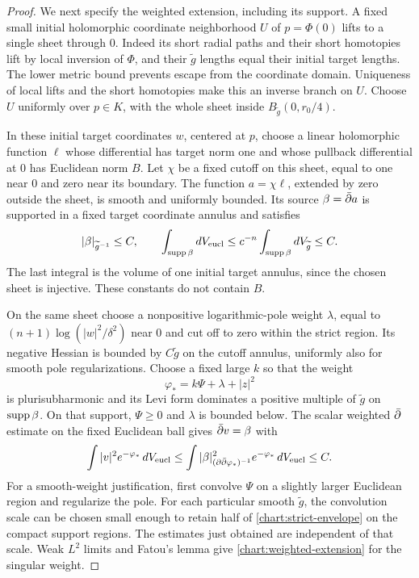 \begin{proof}
We next specify the weighted extension, including its support.
A fixed small initial holomorphic coordinate neighborhood $U$
of $p=\Phi(0)$ lifts to a single sheet through $0$.  Indeed its
short radial paths and their short homotopies lift by local
inversion of $\Phi$, and their $\widetilde g$ lengths equal
their initial target lengths.  The lower metric bound prevents
escape from the coordinate domain.  Uniqueness of local lifts
and the short homotopies make this an inverse branch on $U$.
Choose $U$ uniformly over $p\in K$, with the whole sheet inside
$B_{\widetilde g}(0,r_0/4)$.

In these initial target coordinates $w$, centered at $p$, choose
a linear holomorphic function $\ell$ whose differential has
target norm one and whose pullback differential at $0$ has
Euclidean norm $B$.  Let $\chi$ be a fixed cutoff on this sheet,
equal to one near $0$ and zero near its boundary.  The function
$a=\chi\ell$, extended by zero outside the sheet, is smooth and
uniformly bounded.  Its source $\beta=\bar\partial a$ is supported in
a fixed target coordinate annulus and satisfies
\[
 |\beta|_{\widetilde g^{-1}}\le C,
 \qquad
 \int_{\operatorname{supp}\beta}dV_{\rm eucl}
 \le c^{-n}\int_{\operatorname{supp}\beta}dV_{\widetilde g}
 \le C.
\]
The last integral is the volume of one initial target annulus,
since the chosen sheet is injective.  These constants do not
contain $B$.

On the same sheet choose a nonpositive logarithmic-pole weight
$\lambda$, equal to $(n+1)\log(|w|^2/\delta^2)$ near $0$ and
cut off to zero within the strict region.  Its negative Hessian
is bounded by $C\widetilde g$ on the cutoff annulus, uniformly
also for smooth pole regularizations.  Choose a fixed large
$k$ so that the weight
\[
 \varphi_*=k\Psi+\lambda+|z|^2
\]
is plurisubharmonic and its Levi form dominates a positive
multiple of $\widetilde g$ on $\operatorname{supp}\beta$.
On that support, $\Psi\ge0$ and $\lambda$ is bounded below.
The scalar weighted $\bar\partial$ estimate on the fixed Euclidean
ball \cite{Hormander}\cite[Theorem~5.1 and Remark~4.5]{Demailly} gives
$\bar\partial v=\beta$ with
\begin{equation}\label{chart:weighted-extension}
 \int |v|^2e^{-\varphi_*}\,dV_{\rm eucl}
 \le\int |\beta|^2_{(\partial\bar\partial\varphi_*)^{-1}}
                  e^{-\varphi_*}\,dV_{\rm eucl}\le C.
\end{equation}
For a smooth-weight justification, first convolve $\Psi$ on
a slightly larger Euclidean region and regularize the pole.
For each particular smooth $\widetilde g$, the convolution
scale can be chosen small enough to retain half of
\eqref{chart:strict-envelope} on the compact support regions.
The estimates just obtained are independent of that scale.
Weak $L^2$ limits and Fatou's lemma give
\eqref{chart:weighted-extension} for the singular weight.


\end{proof}
